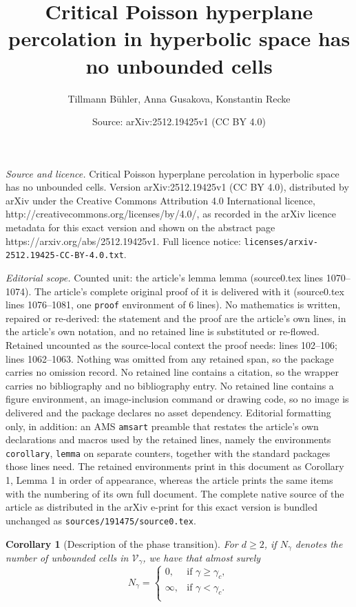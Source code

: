 \documentclass[10pt,a4paper]{amsart}
\title{Critical Poisson hyperplane percolation in hyperbolic space has no unbounded cells}
\author{Tillmann B\"uhler, Anna Gusakova, Konstantin Recke}
\date{Source: arXiv:2512.19425v1 (CC BY 4.0)}
\newtheorem{corollary}{Corollary}
\begin{document}
\maketitle

\noindent\emph{Source and licence.} Critical Poisson hyperplane percolation in hyperbolic space has no unbounded cells. Version arXiv:2512.19425v1 (CC BY 4.0), distributed by arXiv under the Creative Commons Attribution 4.0 International licence, http://creativecommons.org/licenses/by/4.0/, as recorded in the arXiv licence metadata for this exact version and shown on the abstract page https://arxiv.org/abs/2512.19425v1. Full licence notice: \texttt{licenses/arxiv-2512.19425-CC-BY-4.0.txt}.\par\smallskip

\noindent\textit{Editorial scope.} Counted unit: the article's lemma lemma (source0.tex lines 1070--1074). The article's complete original proof of it is delivered with it (source0.tex lines 1076--1081, one \texttt{proof} environment of 6 lines). No mathematics is written, repaired or re-derived: the statement and the proof are the article's own lines, in the article's own notation, and no retained line is substituted or re-flowed.  Retained uncounted as the source-local context the proof needs: lines 102--106; lines 1062--1063.  Nothing was omitted from any retained span, so the package carries no omission record.  No retained line contains a citation, so the wrapper carries no bibliography and no bibliography entry.  No retained line contains a figure environment, an image-inclusion command or drawing code, so no image is delivered and the package declares no asset dependency.  Editorial formatting only, in addition: an AMS \texttt{amsart} preamble that restates the article's own declarations and macros used by the retained lines, namely the environments \texttt{corollary}, \texttt{lemma} on separate counters, together with the standard packages those lines need.  The retained environments print in this document as Corollary 1, Lemma 1 in order of appearance, whereas the article prints the same items with the numbering of its own full document.  The complete native source of the article as distributed in the arXiv e-print for this exact version is bundled unchanged as \texttt{sources/191475/source0.tex}.
\begin{corollary}[Description of the phase transition] \label{cor:phase} For $d\ge2$, if $N_\gamma$ denotes the number of unbounded cells in $\mathcal V_\gamma$, we have that almost surely
$$
N_\gamma = \begin{cases} 0, & \text{if} \, \, \gamma \geq \gamma_c, \\ \infty, & \text{if} \, \, \gamma<\gamma_c. \\ \end{cases}
$$
\end{corollary}
\end{document}
